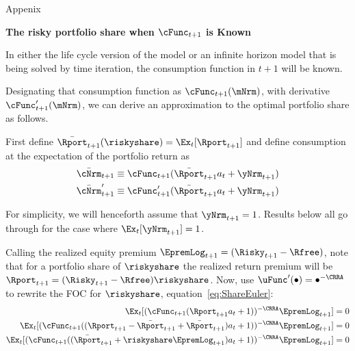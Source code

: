 \documentclass{\econtex}
\begin{document}
\pagebreak
\centerline{\Large Appenix}
\appendix
\medskip\medskip
\centerline{\textbf{\Large The risky portfolio share when $\cFunc_{t+1}$ is Known}}
\medskip\medskip

In either the life cycle version of the model or an infinite horizon model that is being solved by time iteration, the consumption function in $t+1$ will be known.

Designating that consumption function as $\cFunc_{t+1}(\mNrm)$, with derivative $\cFunc^{\prime}_{t+1}(\mNrm)$, we can derive an approximation to the optimal portfolio share as follows.

\newcommand{\ERport}{\bar{\Rport}}
\newcommand{\cNxt}{\bar{\cFunc}_{t+1}}
\newcommand{\orderTwo}{+(1/2)(\riskyshare\EpremLog_{t+1}{a}_{t})^{2}\cFunc^{\prime\prime}_{t+1}}
\renewcommand{\orderTwo}{}

First define $\ERport_{t+1}(\riskyshare)=\Ex_{t}[\Rport_{t+1}]$ and define consumption at the expectation of the portfolio return as
\begin{align*}
\bar{\cNrm}_{t+1} & \equiv  \cFunc_{t+1}(\ERport_{t+1}{a}_{t} + \yNrm_{t+1})
\\ \bar{\cNrm}^{\prime}_{t+1}& \equiv \cFunc_{t+1}^{\prime}(\ERport_{t+1}{a}_{t} + \yNrm_{t+1})
\end{align*}

For simplicity, we will henceforth assume that $\yNrm_{t+1}=1$.  Results below all go through for the case where $\Ex_{t}[\yNrm_{t+1}]=1$.

Calling the realized equity premium $\EpremLog_{t+1}=(\Risky_{t+1}-\Rfree)$, note that for a portfolio share of $\riskyshare$ the realized return premium will be $\Rport_{t+1}=(\Risky_{t+1}-\Rfree)\riskyshare$.  Now, use $\uFunc^{\prime}(\bullet)=\bullet^{-\CRRA}$ to rewrite the FOC for $\riskyshare$, equation~\eqref{eq:ShareEuler}:
\begin{equation}\begin{gathered}\begin{aligned}
\Ex_{t}[(\cFunc_{t+1}(\Rport_{t+1}{a}_{t}+1))^{-\CRRA}\EpremLog_{t+1}] & =  0 \label{eq:ShareEulernewnew}
\\ \Ex_{t}[(\cFunc_{t+1}((\Rport_{t+1}-\ERport_{t+1}+\ERport_{t+1}){a}_{t}+1))^{-\CRRA}\EpremLog_{t+1}] & =  0
\\ \Ex_{t}[(\cFunc_{t+1}((\ERport_{t+1}+\riskyshare\EpremLog_{t+1}){a}_{t}+1))^{-\CRRA}\EpremLog_{t+1}] & =  0
\end{aligned}\end{gathered}\end{equation}
\end{document}
